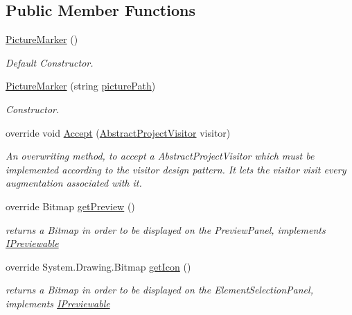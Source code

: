\subsection*{Public Member Functions}
\begin{DoxyCompactItemize}
\item 
\hyperlink{class_a_rdev_kit_1_1_model_1_1_project_1_1_picture_marker_a68c1a2ce39397fd12cacbf0a06674788}{Picture\-Marker} ()
\begin{DoxyCompactList}\small\item\em Default Constructor. \end{DoxyCompactList}\item 
\hyperlink{class_a_rdev_kit_1_1_model_1_1_project_1_1_picture_marker_a19f536df00d7c49aa7ec2c612e5b2cca}{Picture\-Marker} (string \hyperlink{class_a_rdev_kit_1_1_model_1_1_project_1_1_picture_marker_a35143cb6b2a6724b1fce695cdeac06e9}{picture\-Path})
\begin{DoxyCompactList}\small\item\em Constructor. \end{DoxyCompactList}\item 
override void \hyperlink{class_a_rdev_kit_1_1_model_1_1_project_1_1_picture_marker_a9f06478c438150cd695dc8db8140b913}{Accept} (\hyperlink{class_a_rdev_kit_1_1_controller_1_1_project_controller_1_1_abstract_project_visitor}{Abstract\-Project\-Visitor} visitor)
\begin{DoxyCompactList}\small\item\em An overwriting method, to accept a Abstract\-Project\-Visitor which must be implemented according to the visitor design pattern. It lets the visitor visit every augmentation associated with it. \end{DoxyCompactList}\item 
override Bitmap \hyperlink{class_a_rdev_kit_1_1_model_1_1_project_1_1_picture_marker_a9d608a1d9abb84c8109b7f34efffc658}{get\-Preview} ()
\begin{DoxyCompactList}\small\item\em returns a Bitmap in order to be displayed on the Preview\-Panel, implements \hyperlink{interface_a_rdev_kit_1_1_model_1_1_project_1_1_i_previewable}{I\-Previewable} \end{DoxyCompactList}\item 
override System.\-Drawing.\-Bitmap \hyperlink{class_a_rdev_kit_1_1_model_1_1_project_1_1_picture_marker_acf5e1189f44cc8e1d42964e3842d3769}{get\-Icon} ()
\begin{DoxyCompactList}\small\item\em returns a Bitmap in order to be displayed on the Element\-Selection\-Panel, implements \hyperlink{interface_a_rdev_kit_1_1_model_1_1_project_1_1_i_previewable}{I\-Previewable} \end{DoxyCompactList}\item 

\end{DoxyCompactItemize}
